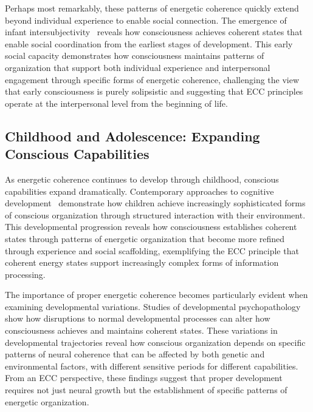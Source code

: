 Perhaps most remarkably, these patterns of energetic coherence quickly extend beyond individual experience to enable social connection. The emergence of infant intersubjectivity~\cite{Trevarthen2011, zheng2025unbearable} reveals how consciousness achieves coherent states that enable social coordination from the earliest stages of development. This early social capacity demonstrates how consciousness maintains patterns of organization that support both individual experience and interpersonal engagement through specific forms of energetic coherence, challenging the view that early consciousness is purely solipsistic and suggesting that ECC principles operate at the interpersonal level from the beginning of life.

\subsection*{Childhood and Adolescence: Expanding Conscious Capabilities}

As energetic coherence continues to develop through childhood, conscious capabilities expand dramatically. Contemporary approaches to cognitive development~\cite{Carey2009, hunt2024electromagnetic} demonstrate how children achieve increasingly sophisticated forms of conscious organization through structured interaction with their environment. This developmental progression reveals how consciousness establishes coherent states through patterns of energetic organization that become more refined through experience and social scaffolding, exemplifying the ECC principle that coherent energy states support increasingly complex forms of information processing.

The importance of proper energetic coherence becomes particularly evident when examining developmental variations. Studies of developmental psychopathology~\cite{Cicchetti2016, bosl2025dynamical} show how disruptions to normal developmental processes can alter how consciousness achieves and maintains coherent states. These variations in developmental trajectories reveal how conscious organization depends on specific patterns of neural coherence that can be affected by both genetic and environmental factors, with different sensitive periods for different capabilities. From an ECC perspective, these findings suggest that proper development requires not just neural growth but the establishment of specific patterns of energetic organization.

